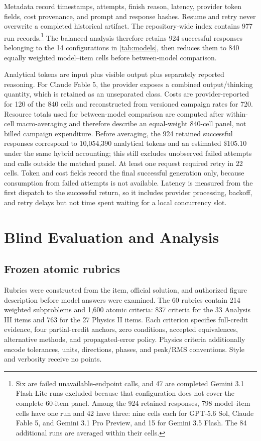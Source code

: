 \documentclass[11pt,a4paper,twocolumn]{article}
\begin{document}
Metadata record timestamps, attempts, finish reason, latency, provider token
fields, cost provenance, and prompt and response hashes. Resume and retry never
overwrite a completed historical artifact. The repository-wide index contains
977 run records.\footnote{Six are failed unavailable-endpoint calls, and 47
are completed Gemini 3.1 Flash-Lite runs excluded because that configuration
does not cover the complete 60-item panel. Among the 924 retained responses,
798 model--item cells have one run and 42 have three: nine cells each for
GPT-5.6 Sol, Claude Fable 5, and Gemini 3.1 Pro Preview, and 15 for Gemini 3.5
Flash. The 84 additional runs are averaged within their cells.}
The balanced analysis therefore retains 924 successful responses belonging to
the 14 configurations in \cref{tab:models}, then reduces them to 840 equally
weighted model--item cells before between-model comparison.

Analytical tokens are input plus visible output plus separately reported
reasoning. For Claude Fable 5, the provider exposes a combined output/thinking
quantity, which is retained as an unseparated class. Costs are provider-reported
for 120 of the 840 cells and reconstructed from versioned campaign rates for
720. Resource totals used for between-model comparison are computed after
within-cell macro-averaging and therefore describe an equal-weight 840-cell
panel, not billed campaign expenditure. Before averaging, the 924 retained
successful responses correspond to 10,054,390 analytical tokens and an
estimated \$105.10 under the same hybrid accounting; this still excludes
unobserved failed attempts and calls outside the matched panel. At least one
request required retry in 22 cells. Token and cost fields record the final
successful generation only, because consumption from failed attempts is not
available. Latency is measured from the first dispatch to the successful
return, so it includes provider processing, backoff, and retry delays but not
time spent waiting for a local concurrency slot.

\section{Blind Evaluation and Analysis}

\subsection{Frozen atomic rubrics}

Rubrics were constructed from the item, official solution, and authorized
figure description before model answers were examined. The 60 rubrics contain
214 weighted subproblems and 1,600 atomic criteria: 837 criteria for the 33
Analysis III items and 763 for the 27 Physics II items. Each criterion specifies
full-credit evidence, four partial-credit anchors, zero conditions, accepted
equivalences, alternative methods, and propagated-error policy. Physics
criteria additionally encode tolerances, units, directions, phases, and
peak/RMS conventions. Style and verbosity receive no points.
\end{document}
